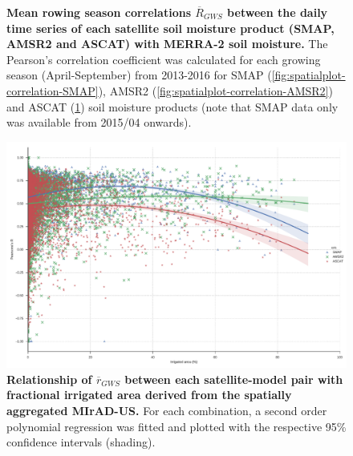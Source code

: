 \documentclass[hess, manuscript]{copernicus}
\begin{document}
\begin{figure}
\begin{subfigure}[t]{0.55\textwidth}
       \caption{}
       \label{fig:spatialplot-correlation-ASCAT}
   \end{subfigure}
   \caption{\textbf{Mean rowing season correlations $\overline{R}_{GWS}$ between the daily time series of each satellite soil moisture product (SMAP, AMSR2 and ASCAT) with MERRA-2 soil moisture.} The Pearson's correlation coefficient was calculated for each growing season (April-September) from 2013-2016 for SMAP (\ref{fig:spatialplot-correlation-SMAP}), AMSR2 (\ref{fig:spatialplot-correlation-AMSR2}) and ASCAT (\ref{fig:spatialplot-correlation-ASCAT}) soil moisture products (note that SMAP data only was available from 2015/04 onwards).}
   \label{fig:spatialplot-correlation}
\end{figure}

\begin{figure}[t]
  \includegraphics[width=\textwidth]{figures/correlation/scatter_corr_irrigation_fraction_v2_2nd_order_fit}
  \caption{\textbf{Relationship of $\overline{r}_{GWS}$ between each satellite-model pair with fractional irrigated area derived from the spatially aggregated MIrAD-US.} For each combination, a second order polynomial regression was fitted and plotted with the respective 95\% confidence intervals (shading).}
  \label{fig:scatterplot-corr-irrigfrac}
\end{figure}
\end{document}
